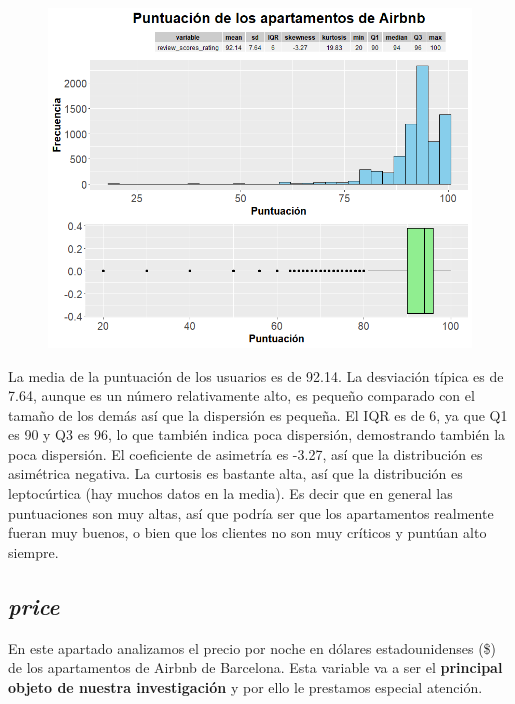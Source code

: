 \documentclass{article}
\begin{document}
\vspace{0.35cm}
\begin{figure}[h]
\hspace*{-0.15cm}
\centering
\includegraphics[scale = 0.6]{grafico_scores_rating}
\end{figure}
\vspace{0.15cm}

La media de la puntuación de los usuarios es de 92.14.
La desviación típica es de 7.64, aunque es un número relativamente alto, es pequeño comparado con el tamaño de los demás así que la dispersión es pequeña.  
El IQR es de 6, ya que Q1 es 90 y Q3 es 96, lo que también indica poca dispersión, demostrando también la poca dispersión.
El coeficiente de asimetría es -3.27, así que la distribución es asimétrica negativa.
La curtosis es bastante alta, así que la distribución es leptocúrtica (hay muchos datos en la media).
Es decir que en general las puntuaciones son muy altas, así que podría ser que los apartamentos realmente fueran muy buenos, o bien que los clientes no son muy críticos y puntúan alto siempre.

\clearpage
\subsection{\emph{price}}
En este apartado analizamos el precio por noche en dólares estadounidenses (\$) de los apartamentos de Airbnb de Barcelona. Esta variable va a ser el \textbf{principal objeto de nuestra investigación} y por ello le prestamos especial atención. 
\end{document}
